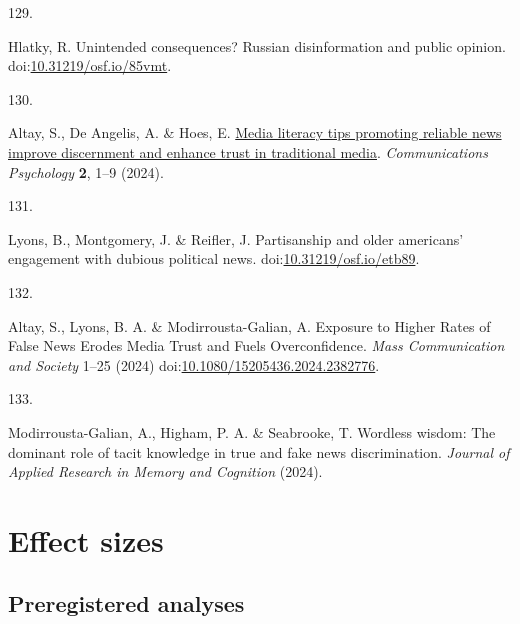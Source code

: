 \documentclass[
  doc,floatsintext]{apa6}
\newlength{\cslhangindent}
\newlength{\csllabelwidth}
\newenvironment{CSLReferences}[2] %
 {\begin{list}{}{%
  \setlength{\itemindent}{0pt}
  \setlength{\leftmargin}{0pt}
  \setlength{\parsep}{0pt}
  \ifodd #1
   \setlength{\leftmargin}{\cslhangindent}
   \setlength{\itemindent}{-1\cslhangindent}
  \fi
  \setlength{\itemsep}{#2\baselineskip}}}
 {\end{list}}
\newcommand{\CSLLeftMargin}[1]{\parbox[t]{\csllabelwidth}{\strut#1\strut}}
\newcommand{\CSLRightInline}[1]{\parbox[t]{\linewidth - \csllabelwidth}{\strut#1\strut}}
\begin{document}
\begin{CSLReferences}{0}{0}
\CSLLeftMargin{129. }%
\CSLRightInline{*Hlatky, R. Unintended consequences? Russian disinformation and public opinion. doi:\href{https://doi.org/10.31219/osf.io/85vmt}{10.31219/osf.io/85vmt}.}

\CSLLeftMargin{130. }%
\CSLRightInline{*Altay, S., De Angelis, A. \& Hoes, E. \href{https://doi.org/10.1038/s44271-024-00121-5}{Media literacy tips promoting reliable news improve discernment and enhance trust in traditional media}. \emph{Communications Psychology} \textbf{2}, 1--9 (2024).}

\CSLLeftMargin{131. }%
\CSLRightInline{*Lyons, B., Montgomery, J. \& Reifler, J. Partisanship and older americans{'} engagement with dubious political news. doi:\href{https://doi.org/10.31219/osf.io/etb89}{10.31219/osf.io/etb89}.}

\CSLLeftMargin{132. }%
\CSLRightInline{*Altay, S., Lyons, B. A. \& Modirrousta-Galian, A. Exposure to Higher Rates of False News Erodes Media Trust and Fuels Overconfidence. \emph{Mass Communication and Society} 1--25 (2024) doi:\href{https://doi.org/10.1080/15205436.2024.2382776}{10.1080/15205436.2024.2382776}.}

\CSLLeftMargin{133. }%
\CSLRightInline{*Modirrousta-Galian, A., Higham, P. A. \& Seabrooke, T. Wordless wisdom: The dominant role of tacit knowledge in true and fake news discrimination. \emph{Journal of Applied Research in Memory and Cognition} (2024).}

\end{CSLReferences}

\endgroup

\newpage

\appendix


\section{Effect sizes}\label{effect-sizes}

\subsection{Preregistered analyses}\label{preregistered-analyses}

\FloatBarrier
\end{document}
